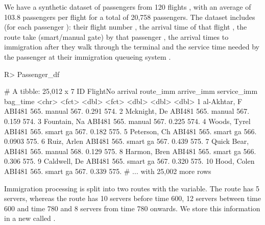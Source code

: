 \documentclass[article]{jss}
\begin{document}
We have a synthetic dataset of passengers  from 120 flights , with an average of 103.8 passengers per flight for a total of 20,758 passengers. The dataset includes (for each passenger ): their flight number , the arrival time of that flight , the route take (smart/manual gate) by that passenger , the arrival times to immigration after they walk through the terminal  and the service time needed by the passenger at their immigration queueing system . 

\begin{CodeChunk}
\begin{Sinput}
R> Passenger_df
\end{Sinput}
\begin{Soutput}
# A tibble: 25,012 x 7
   ID            FlightNo arrival route_imm arrive_imm service_imm bag_time
   <chr>         <fct>      <dbl> <fct>          <dbl>       <dbl>    <dbl>
 1 al-Akhtar, F  ABI481      565. manual          567.      0.291      574.
 2 Mcknight, De  ABI481      565. manual          567.      0.159      574.
 3 Fountain, Na  ABI481      565. manual          567.      0.225      574.
 4 Woods, Tyrel  ABI481      565. smart ga        567.      0.182      575.
 5 Peterson, Ch  ABI481      565. smart ga        566.      0.0903     575.
 6 Ruiz, Arlen   ABI481      565. smart ga        567.      0.439      575.
 7 Quick Bear,   ABI481      565. manual          568.      0.129      575.
 8 Harmon, Bren  ABI481      565. smart ga        566.      0.306      575.
 9 Caldwell, De  ABI481      565. smart ga        567.      0.320      575.
10 Hood, Colen   ABI481      565. smart ga        567.      0.339      575.
# ... with 25,002 more rows
\end{Soutput}
\end{CodeChunk}

Immigration processing is split into two routes with the  variable. The  route has 5 servers, whereas the  route has 10 servers before time 600, 12 servers between time 600 and time 780 and 8 servers from time 780 onwards. We store this information in a new  called . 

\begin{CodeChunk}
\end{CodeChunk}
\end{document}
